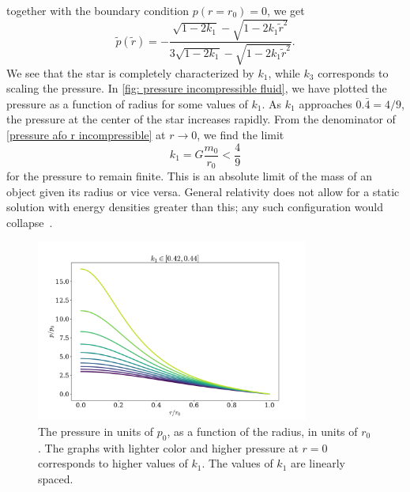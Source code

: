 %
together with the boundary condition $p(r = r_0) = 0$, we get 
%
\begin{equation}
    \label{pressure afo r incompressible}
    \tilde p(\tilde r) 
    = 
    - \frac{\sqrt{1 - 2 k_1} - \sqrt{1 - 2 k_1 \tilde r^2}}
    {3 \sqrt{1 - 2 k_1 } - \sqrt{1 - 2 k_1 \tilde r^2}}.
\end{equation}
%
We see that the star is completely characterized by $k_1$, while $k_3$ corresponds to scaling the pressure.
In \autoref{fig: pressure incompressible fluid}, we have plotted the pressure as a function of radius for some values of $k_1$.
As $k_1$ approaches $0.\bar 4 = 4/9$, the pressure at the center of the star increases rapidly.
From the denominator of \autoref{pressure afo r incompressible} at $r\rightarrow 0$, we find the limit
%
\begin{equation}
    k_1 = G \frac{m_0}{r_0} < \frac{4}{9}
\end{equation}
%
for the pressure to remain finite.
This is an absolute limit of the mass of an object given its radius or vice versa.
General relativity does not allow for a static solution with energy densities greater than this; any such configuration would collapse~\autocite{carrollSpacetimeGeometryIntroduction2019}.


\begin{figure}[h]
    \centering
    \includegraphics[width=0.8\textwidth]{../scripts/figurer/incompressible.pdf}
    \caption{The pressure in units of $p_0$, as a function of the radius, in units of $r_0$. The graphs with lighter color and higher pressure at $r = 0$ corresponds to higher values of $k_1$. The values of $k_1$ are linearly spaced.}
    \label{fig: pressure incompressible fluid}
\end{figure}

